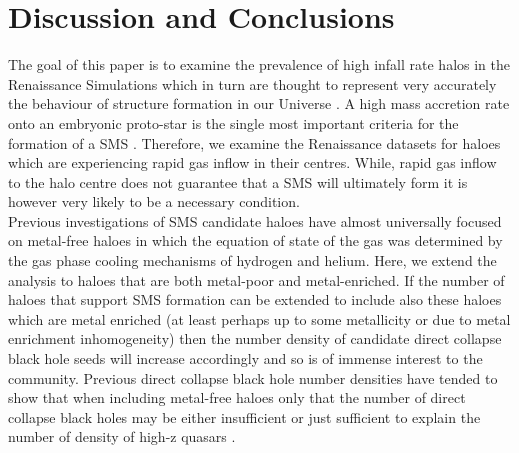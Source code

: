\documentclass[graphics, twocolumn, usenatbib]{mn2e}
\begin{document}
\section{Discussion and Conclusions} \label{Sec:Discussion}
The goal of this paper is to examine the prevalence of high infall rate halos in the
Renaissance Simulations which in turn are thought to represent very accurately the
behaviour of structure formation in our Universe \citep{Chen_2014, Xu_2013, Xu_2014, OShea_2015,
  Barrow_2017, Wise_2019}. A high mass accretion rate onto an embryonic proto-star is the
single most important criteria for the formation of a SMS \citep{Hosokawa_2013, Sakurai_2016,
  Woods_2018}. Therefore, we examine the Renaissance datasets for haloes which are experiencing
rapid gas inflow in their centres. While, rapid gas inflow to the halo centre does not guarantee
that a SMS will ultimately form it is however very likely to be a necessary condition. \\
\indent Previous investigations of SMS candidate haloes have almost universally focused on
metal-free haloes in which the equation of state of the gas was determined by the gas phase
cooling mechanisms of hydrogen and helium. Here, we extend the analysis to haloes that are both
metal-poor and metal-enriched. If the number of haloes that support SMS formation can be extended to
include also these haloes which are metal enriched (at least perhaps up to some metallicity or
due to metal enrichment inhomogeneity) then the
number density of candidate direct collapse black hole seeds will increase accordingly and so is of
immense interest to the community. Previous direct collapse black hole number densities have
tended to show that when including metal-free haloes only  that the number of direct collapse
black holes may be either insufficient or just sufficient to explain the number of density of
high-z quasars \citep{Agarwal_2012, Visbal_2014b, Agarwal_2015b, Latif_2014a,
  Valiante_2016, Habouzit_2016, Valiante_2017, Habouzit_2017, Regan_2017}. \\
\end{document}
